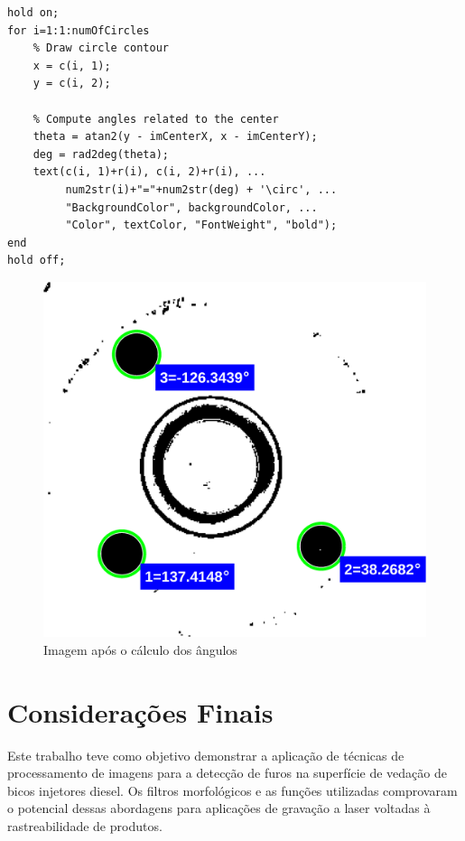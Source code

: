 \documentclass[conference]{IEEEtran}
\begin{document}
\begin{lstlisting}[caption={Cálculo dos ângulos em relação ao centro da imagem}, label={lst:codigo-compute-angle}]
hold on;
for i=1:1:numOfCircles
	% Draw circle contour
	x = c(i, 1);
	y = c(i, 2);
	
	% Compute angles related to the center 
	theta = atan2(y - imCenterX, x - imCenterY);
	deg = rad2deg(theta);
	text(c(i, 1)+r(i), c(i, 2)+r(i), ...
		 num2str(i)+"="+num2str(deg) + '\circ', ...
		 "BackgroundColor", backgroundColor, ...
		 "Color", textColor, "FontWeight", "bold");
end
hold off;
\end{lstlisting}

\begin{figure}[h]
	\centering
	\includegraphics[scale=0.70]{Images/Image0000_computed.png}
	\caption{Imagem após o cálculo dos ângulos}
	\label{fig:compute-angle}
\end{figure}

\section*{Considerações Finais}
Este trabalho teve como objetivo demonstrar a aplicação de técnicas de processamento de imagens para a detecção de furos na superfície de vedação de bicos injetores diesel. Os filtros morfológicos e as funções utilizadas comprovaram o potencial dessas abordagens para aplicações de gravação a laser voltadas à rastreabilidade de produtos.
\end{document}
